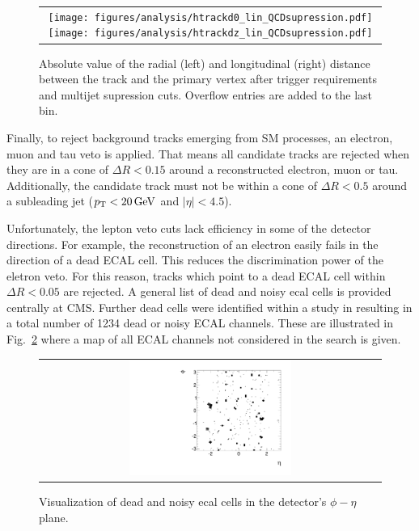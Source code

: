\begin{figure}[!t]
  \centering 
  \begin{tabular}{c}
    \texttt{[image: figures/analysis/htrackd0\_lin\_QCDsupression.pdf]}
    \texttt{[image: figures/analysis/htrackdz\_lin\_QCDsupression.pdf]}
  \end{tabular}
  \caption{Absolute value of the radial (left) and longitudinal (right) distance between the track and the primary vertex after trigger requirements and multijet supression cuts. 
           Overflow entries are added to the last bin.}
  \label{fig:d0_dz}
\end{figure}

Finally, to reject background tracks emerging from SM processes, an electron, muon and tau veto is applied.
That means all candidate tracks are rejected when they are in a cone of $\Delta R<0.15$ around a reconstructed electron, muon or tau.
Additionally, the candidate track must not be within a cone of $\Delta R<0.5$ around a subleading jet ($p_{\text{T}}<20\,\text{Ge}\kern-0.06667em\text{V}$ and $|\eta|<4.5$).

Unfortunately, the lepton veto cuts lack efficiency in some of the detector directions.
For example, the reconstruction of an electron easily fails in the direction of a dead ECAL cell.
This reduces the discrimination power of the eletron veto.
For this reason, tracks which point to a dead ECAL cell within $\Delta R < 0.05$  are rejected.
A general list of dead and noisy ecal cells is provided centrally at CMS.
Further dead cells were identified within a study in \cite{bib:CMS:DT_8TeV} resulting in a total number of 1234 dead or noisy ECAL channels. 
These are illustrated in Fig.~\ref{fig:DeadECALmap} where a map of all ECAL channels not considered in the search is given.
\begin{figure}[!t]
  \centering 
  \begin{tabular}{c}
    \includegraphics[width=0.49\textwidth]{figures/analysis/DeadECALMap.pdf}
  \end{tabular}
  \caption{Visualization of dead and noisy ecal cells in the detector's $\phi - \eta$ plane.}
  \label{fig:DeadECALmap}
\end{figure}

